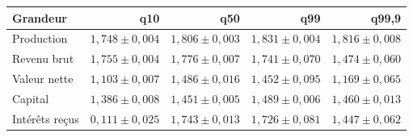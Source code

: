 \begin{longtable}{@{}lrrrr@{}}
\toprule
Grandeur & q10 & q50 & q99 & q99,9 \\
\midrule
\endhead
Production & $1{,}748 \pm 0{,}004$ & $1{,}806 \pm 0{,}003$ & $1{,}831 \pm 0{,}004$ & $1{,}816 \pm 0{,}008$ \\
Revenu brut & $1{,}755 \pm 0{,}004$ & $1{,}776 \pm 0{,}007$ & $1{,}741 \pm 0{,}070$ & $1{,}474 \pm 0{,}060$ \\
Valeur nette & $1{,}103 \pm 0{,}007$ & $1{,}486 \pm 0{,}016$ & $1{,}452 \pm 0{,}095$ & $1{,}169 \pm 0{,}065$ \\
Capital & $1{,}386 \pm 0{,}008$ & $1{,}451 \pm 0{,}005$ & $1{,}489 \pm 0{,}006$ & $1{,}460 \pm 0{,}013$ \\
Intérêts reçus & $0{,}111 \pm 0{,}025$ & $1{,}743 \pm 0{,}013$ & $1{,}726 \pm 0{,}081$ & $1{,}447 \pm 0{,}062$ \\
\bottomrule
\end{longtable}
